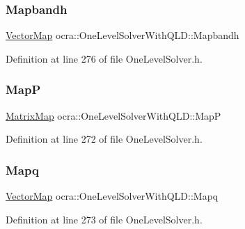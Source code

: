 \subsubsection{\texorpdfstring{Mapbandh}{Mapbandh}}
{\footnotesize\ttfamily \hyperlink{group__solver_ga48f83fdb8879c800a49682c6f9c3f2e5}{Vector\+Map} ocra\+::\+One\+Level\+Solver\+With\+Q\+L\+D\+::\+Mapbandh\hspace{0.3cm}{\ttfamily [protected]}}



Definition at line 276 of file One\+Level\+Solver.\+h.

\hypertarget{classocra_1_1OneLevelSolverWithQLD_abf57e1d9653bf9c6a0c69ba9049fdfaa}{}\label{classocra_1_1OneLevelSolverWithQLD_abf57e1d9653bf9c6a0c69ba9049fdfaa} 
\subsubsection{\texorpdfstring{MapP}{MapP}}
{\footnotesize\ttfamily \hyperlink{group__solver_ga2890a4739c18700eeea0645d1e41b5f7}{Matrix\+Map} ocra\+::\+One\+Level\+Solver\+With\+Q\+L\+D\+::\+MapP\hspace{0.3cm}{\ttfamily [protected]}}



Definition at line 272 of file One\+Level\+Solver.\+h.

\hypertarget{classocra_1_1OneLevelSolverWithQLD_a46b6cd8f4d8cd28cf60ba99231ab182d}{}\label{classocra_1_1OneLevelSolverWithQLD_a46b6cd8f4d8cd28cf60ba99231ab182d} 
\subsubsection{\texorpdfstring{Mapq}{Mapq}}
{\footnotesize\ttfamily \hyperlink{group__solver_ga48f83fdb8879c800a49682c6f9c3f2e5}{Vector\+Map} ocra\+::\+One\+Level\+Solver\+With\+Q\+L\+D\+::\+Mapq\hspace{0.3cm}{\ttfamily [protected]}}



Definition at line 273 of file One\+Level\+Solver.\+h.

\hypertarget{classocra_1_1OneLevelSolverWithQLD_aad35b068cc43424c11d03acc3fa50efb}{}\label{classocra_1_1OneLevelSolverWithQLD_aad35b068cc43424c11d03acc3fa50efb} 

